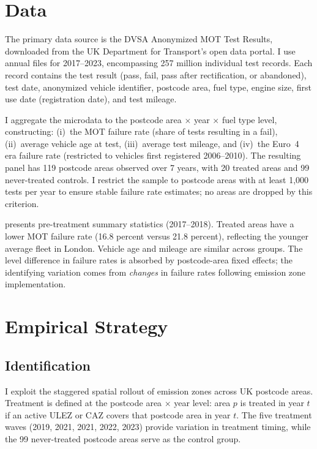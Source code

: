 \documentclass[12pt]{article}
\begin{document}
\section{Data}

The primary data source is the DVSA Anonymized MOT Test Results, downloaded from the UK Department for Transport's open data portal. I use annual files for 2017--2023, encompassing 257 million individual test records. Each record contains the test result (pass, fail, pass after rectification, or abandoned), test date, anonymized vehicle identifier, postcode area, fuel type, engine size, first use date (registration date), and test mileage.

I aggregate the microdata to the postcode area $\times$ year $\times$ fuel type level, constructing: (i)~the MOT failure rate (share of tests resulting in a fail), (ii)~average vehicle age at test, (iii)~average test mileage, and (iv)~the Euro~4 era failure rate (restricted to vehicles first registered 2006--2010). The resulting panel has 119 postcode areas observed over 7 years, with 20 treated areas and 99 never-treated controls. I restrict the sample to postcode areas with at least 1,000 tests per year to ensure stable failure rate estimates; no areas are dropped by this criterion.



 presents pre-treatment summary statistics (2017--2018). Treated areas have a lower MOT failure rate (16.8 percent versus 21.8 percent), reflecting the younger average fleet in London. Vehicle age and mileage are similar across groups. The level difference in failure rates is absorbed by postcode-area fixed effects; the identifying variation comes from \textit{changes} in failure rates following emission zone implementation.


\section{Empirical Strategy}

\subsection{Identification}

I exploit the staggered spatial rollout of emission zones across UK postcode areas. Treatment is defined at the postcode area $\times$ year level: area $p$ is treated in year $t$ if an active ULEZ or CAZ covers that postcode area in year $t$. The five treatment waves (2019, 2021, 2021, 2022, 2023) provide variation in treatment timing, while the 99 never-treated postcode areas serve as the control group.
\end{document}
